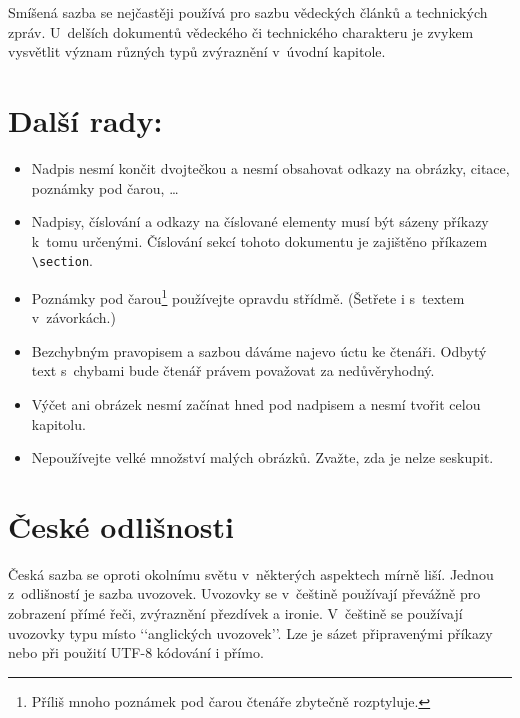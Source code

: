 \documentclass[a4paper, twocolumn, 10pt]{article}
\begin{document}
Smíšená sazba se nejčastěji používá pro sazbu vědeckých článků a technických zpráv.
U~delších dokumentů vědeckého či technického charakteru je zvykem
vysvětlit význam různých typů zvýraznění v~úvodní kapitole.

\section{Další rady:}

\begin{itemize}

	\item Nadpis nesmí končit dvojtečkou a nesmí obsahovat odkazy na obrázky, citace, poznámky pod čarou, \dots

	\item Nadpisy, číslování a odkazy na číslované elementy musí být sázeny příkazy k~tomu určenými.
	      Číslování sekcí tohoto dokumentu je zajištěno příkazem \verb|\section|.

	\item Poznámky pod čarou\footnote{Příliš mnoho poznámek pod čarou čtenáře zbytečně rozptyluje.}
	      používejte opravdu střídmě. (Šetřete i s~textem v~závorkách.)

	\item Bezchybným pravopisem a sazbou dáváme najevo úctu ke čtenáři.
	      Odbytý text s~chybami bude čtenář právem považovat za nedůvěryhodný.

	\item Výčet ani obrázek nesmí začínat hned pod nadpisem a nesmí tvořit celou kapitolu.

	\item Nepoužívejte velké množství malých obrázků.
	      Zvažte, zda je nelze seskupit.

\end{itemize}

\section{České odlišnosti}

Česká sazba se oproti okolnímu světu v~některých aspektech mírně liší.
Jednou z~odlišností je sazba uvozovek.
Uvozovky se v~češtině používají převážně pro zobrazení přímé řeči, zvýraznění přezdívek a ironie.
V~češtině se používají uvozovky typu  místo ‘‘anglických uvozovek’’.
Lze je sázet připravenými příkazy nebo při použití UTF-8 kódování i přímo.
\end{document}
